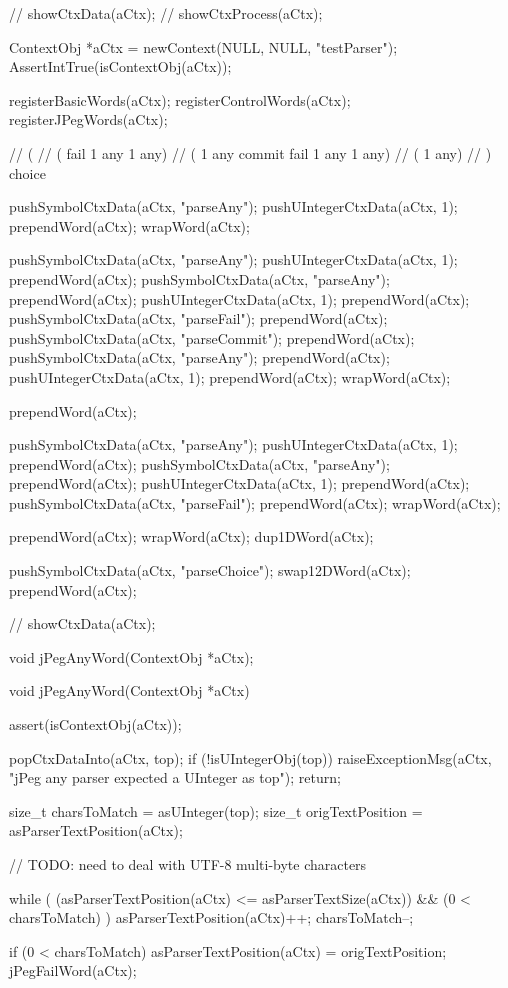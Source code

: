 //  showCtxData(aCtx);
//  showCtxProcess(aCtx);

\stopCTest
\stopTestCase


\startCTest
  ContextObj *aCtx = newContext(NULL, NULL, "testParser");
  AssertIntTrue(isContextObj(aCtx));
  
  registerBasicWords(aCtx);
  registerControlWords(aCtx);
  registerJPegWords(aCtx);

  // (
  //   ( fail 1 any 1 any)
  //   ( 1 any commit fail 1 any 1 any)
  //   ( 1 any)
  // ) choice

  pushSymbolCtxData(aCtx, "parseAny");
  pushUIntegerCtxData(aCtx, 1);
  prependWord(aCtx);
  wrapWord(aCtx);
  
  pushSymbolCtxData(aCtx, "parseAny");
  pushUIntegerCtxData(aCtx, 1);
  prependWord(aCtx);
  pushSymbolCtxData(aCtx, "parseAny");
  prependWord(aCtx);
  pushUIntegerCtxData(aCtx, 1);
  prependWord(aCtx);
  pushSymbolCtxData(aCtx, "parseFail");
  prependWord(aCtx);
  pushSymbolCtxData(aCtx, "parseCommit");
  prependWord(aCtx);
  pushSymbolCtxData(aCtx, "parseAny");
  prependWord(aCtx);
  pushUIntegerCtxData(aCtx, 1);
  prependWord(aCtx);
  wrapWord(aCtx);
  
  prependWord(aCtx);
  
  pushSymbolCtxData(aCtx, "parseAny");
  pushUIntegerCtxData(aCtx, 1);
  prependWord(aCtx);
  pushSymbolCtxData(aCtx, "parseAny");
  prependWord(aCtx);
  pushUIntegerCtxData(aCtx, 1);
  prependWord(aCtx);
  pushSymbolCtxData(aCtx, "parseFail");
  prependWord(aCtx);
  wrapWord(aCtx);
  
  prependWord(aCtx);
  wrapWord(aCtx);
  dup1DWord(aCtx);
  
  pushSymbolCtxData(aCtx, "parseChoice");
  swap12DWord(aCtx);
  prependWord(aCtx);
  
//  showCtxData(aCtx);
\stopCTest
\stopTestCase
\stopTestSuite


\startCHeader
void jPegAnyWord(ContextObj *aCtx);
\stopCHeader

\startCCode
void jPegAnyWord(ContextObj *aCtx) {
  assert(isContextObj(aCtx));
  
  popCtxDataInto(aCtx, top);
  if (!isUIntegerObj(top)) {
    raiseExceptionMsg(aCtx,
      "jPeg any parser expected a UInteger as top");
    return;
  }
  
  size_t charsToMatch     = asUInteger(top);
  size_t origTextPosition = asParserTextPosition(aCtx);
  
  // TODO: need to deal with UTF-8 multi-byte characters
  
  while (
    (asParserTextPosition(aCtx) <= asParserTextSize(aCtx)) &&
    (0 < charsToMatch)
  ) {
    asParserTextPosition(aCtx)++;
    charsToMatch--;
  }
    
  if (0 < charsToMatch) {
    asParserTextPosition(aCtx) = origTextPosition;
    jPegFailWord(aCtx);
  }

}
\stopCCode

